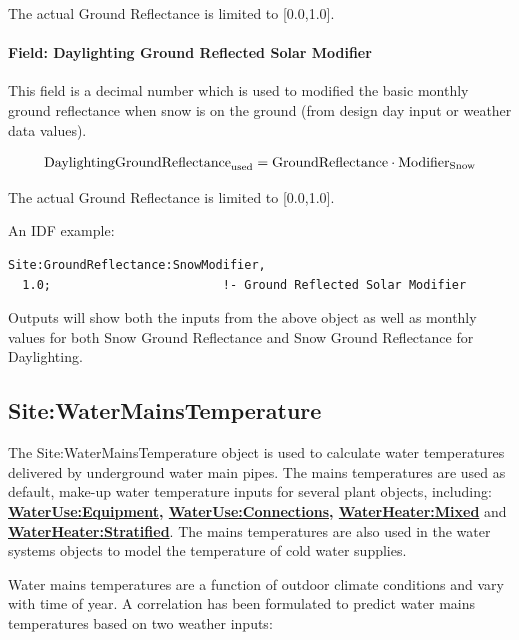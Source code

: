 The actual Ground Reflectance is limited to {[}0.0,1.0{]}.

\paragraph{Field: Daylighting Ground Reflected Solar Modifier}\label{field-daylighting-ground-reflected-solar-modifier}

This field is a decimal number which is used to modified the basic monthly ground reflectance when snow is on the ground (from design day input or weather data values).

\begin{equation}
\rm{DaylightingGroundReflectance}_{\rm{used}} = \rm{GroundReflectance} \cdot \rm{Modifier}_{\rm{Snow}}
\end{equation}

The actual Ground Reflectance is limited to {[}0.0,1.0{]}.

An IDF example:

\begin{lstlisting}
Site:GroundReflectance:SnowModifier,
  1.0;                        !- Ground Reflected Solar Modifier
\end{lstlisting}

Outputs will show both the inputs from the above object as well as monthly values for both Snow Ground Reflectance and Snow Ground Reflectance for Daylighting.

\subsection{Site:WaterMainsTemperature}\label{sitewatermainstemperature}

The Site:WaterMainsTemperature object is used to calculate water temperatures delivered by underground water main pipes. The mains temperatures are used as default, make-up water temperature inputs for several plant objects, including: \textbf{\hyperref[wateruseequipment]{WaterUse:Equipment}, \hyperref[wateruseconnections]{WaterUse:Connections}, \hyperref[waterheatermixed]{WaterHeater:Mixed}} and \textbf{\hyperref[waterheaterstratified]{WaterHeater:Stratified}}. The mains temperatures are also used in the water systems objects to model the temperature of cold water supplies.

Water mains temperatures are a function of outdoor climate conditions and vary with time of year. A correlation has been formulated to predict water mains temperatures based on two weather inputs:

